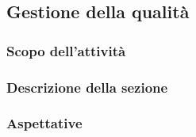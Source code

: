 \subsection{Gestione della qualità}
\subsubsection{Scopo dell'attività} 
\subsubsection{Descrizione della sezione} 
\subsubsection{Aspettative}